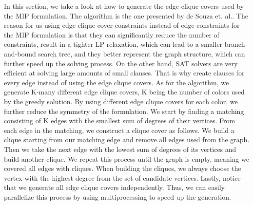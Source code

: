 In this section, we take a look at how to generate the edge clique covers used by the MIP formulation. The algorithm is the one presented by de Souza et. al.\cite{zambon2014exact}. The reason for us using edge clique cover constraints instead of edge constraints for the MIP formulation is that they can significantly reduce the number of constraints, result in a tighter LP relaxation, which can lead to a smaller branch-and-bound search tree, and they better represent the graph structure, which can further speed up the solving process. On the other hand, SAT solvers are very efficient at solving large amounts of small clauses. That is why create clauses for every edge instead of using the edge clique covers. 
As for the algorithm, we generate K-many different edge clique covers, K being the number of colors used by the greedy solution. By using different edge clique covers for each color, we further reduce the symmetry of the formulation. We start by finding a matching consisting of K edges with the smallest sum of degrees of their vertices. From each edge in the matching, we construct a clique cover as follows. We build a clique starting from our matching edge and remove all edges used from the graph. Then we take the next edge with the lowest sum of degrees of its vertices and build another clique. We repeat this process until the graph is empty, meaning we covered all edges with cliques. When building the cliques, we always choose the vertex with the highest degree from the set of candidate vertices. Lastly, notice that we generate all edge clique covers independently. Thus, we can easily parallelize this process by using multiprocessing to speed up the generation.

